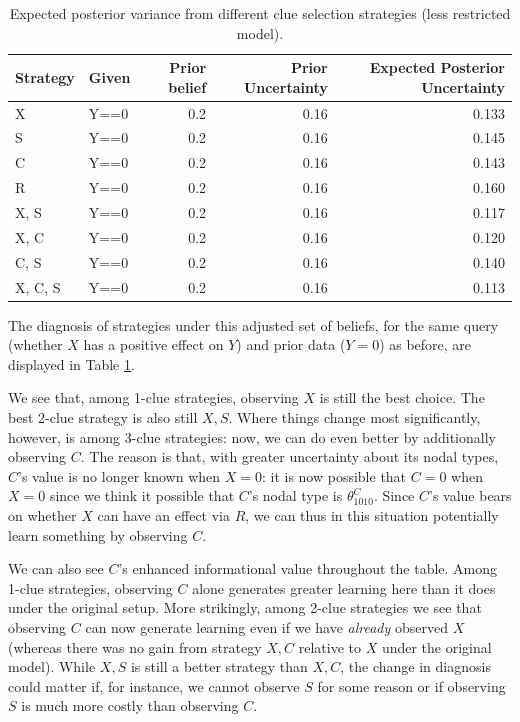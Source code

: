 \documentclass[
  12pt,
]{book}
\begin{document}
\begin{table}

\caption{\label{tab:scxrylearning2}Expected posterior variance from different clue selection strategies (less restricted model).}
\centering
\begin{tabular}[t]{l|l|r|r|r}
\hline
Strategy & Given & Prior belief & Prior Uncertainty & Expected Posterior Uncertainty\\
\hline
X & Y==0 & 0.2 & 0.16 & 0.133\\
\hline
S & Y==0 & 0.2 & 0.16 & 0.145\\
\hline
C & Y==0 & 0.2 & 0.16 & 0.143\\
\hline
R & Y==0 & 0.2 & 0.16 & 0.160\\
\hline
X, S & Y==0 & 0.2 & 0.16 & 0.117\\
\hline
X, C & Y==0 & 0.2 & 0.16 & 0.120\\
\hline
C, S & Y==0 & 0.2 & 0.16 & 0.140\\
\hline
X, C, S & Y==0 & 0.2 & 0.16 & 0.113\\
\hline
\end{tabular}
\end{table}

The diagnosis of strategies under this adjusted set of beliefs, for the same query (whether \(X\) has a positive effect on \(Y\)) and prior data (\(Y=0\)) as before, are displayed in Table \ref{tab:scxrylearning2}.

We see that, among 1-clue strategies, observing \(X\) is still the best choice. The best 2-clue strategy is also still \(X, S\). Where things change most significantly, however, is among 3-clue strategies: now, we can do even better by additionally observing \(C\). The reason is that, with greater uncertainty about its nodal types, \(C\)'s value is no longer known when \(X=0\): it is now possible that \(C=0\) when \(X=0\) since we think it possible that \(C\)'s nodal type is \(\theta^C_{1010}\). Since \(C\)'s value bears on whether \(X\) can have an effect via \(R\), we can thus in this situation potentially learn something by observing \(C\).

We can also see \(C\)'s enhanced informational value throughout the table. Among 1-clue strategies, observing \(C\) alone generates greater learning here than it does under the original setup. More strikingly, among 2-clue strategies we see that observing \(C\) can now generate learning even if we have \emph{already} observed \(X\) (whereas there was no gain from strategy \(X, C\) relative to \(X\) under the original model). While \(X, S\) is still a better strategy than \(X, C\), the change in diagnosis could matter if, for instance, we cannot observe \(S\) for some reason or if observing \(S\) is much more costly than observing \(C\).
\end{document}
